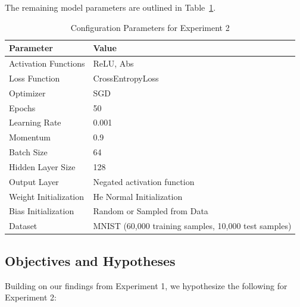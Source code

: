 The remaining model parameters are outlined in Table~\ref{tab:config_params_2}.

\begin{table}[h]
\centering
\caption{Configuration Parameters for Experiment 2}
\label{tab:config_params_2}
\begin{tabular}{ll}
\hline
Parameter & Value \\
\hline
Activation Functions & ReLU, Abs \\
Loss Function & CrossEntropyLoss \\
Optimizer & SGD \\
Epochs & 50 \\
Learning Rate & 0.001 \\
Momentum & 0.9 \\
Batch Size & 64 \\
Hidden Layer Size & 128 \\
Output Layer & Negated activation function \\
Weight Initialization & He Normal Initialization \\
Bias Initialization & Random or Sampled from Data \\
Dataset & MNIST (60,000 training samples, 10,000 test samples) \\
\hline
\end{tabular}
\end{table}

\subsection{Objectives and Hypotheses}

Building on our findings from Experiment 1, we hypothesize the following for Experiment 2:

